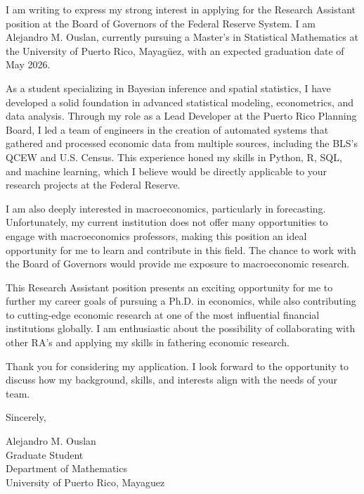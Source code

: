 \documentclass{article}
\begin{document}
I am writing to express my strong interest in applying for the Research Assistant position at the Board of Governors of the Federal Reserve System.
I am Alejandro M. Ouslan, currently pursuing a Master’s in Statistical Mathematics at the University of Puerto Rico, Mayagüez, with an expected graduation date of May 2026.

As a student specializing in Bayesian inference and spatial statistics, I have developed a solid foundation in advanced statistical modeling, econometrics, and data analysis.
Through my role as a Lead Developer at the Puerto Rico Planning Board, I led a team of engineers in the creation of automated systems that gathered and processed economic data
from multiple sources, including the BLS’s QCEW and U.S. Census. This experience honed my skills in Python, R, SQL, and machine learning, which I believe would be directly
applicable to your research projects at the Federal Reserve.

I am also deeply interested in macroeconomics, particularly in forecasting. Unfortunately, my current institution does not offer many opportunities to engage with macroeconomics professors,
making this position an ideal opportunity for me to learn and contribute in this field. The chance to work with the Board of Governors would provide me exposure to macroeconomic
research.

This Research Assistant position presents an exciting opportunity for me to further my career goals of pursuing a Ph.D. in economics, while also contributing to
cutting-edge economic research at one of the most influential financial institutions globally. I am enthusiastic about the possibility of collaborating with
other RA's and applying my skills in fathering economic research.

Thank you for considering my application. I look forward to the opportunity to discuss how my background, skills, and interests align with the needs of your team.

Sincerely,  
\vspace{20pt}  

Alejandro M. Ouslan \\
Graduate Student \\
Department of Mathematics \\
University of Puerto Rico, Mayaguez
\end{document}
